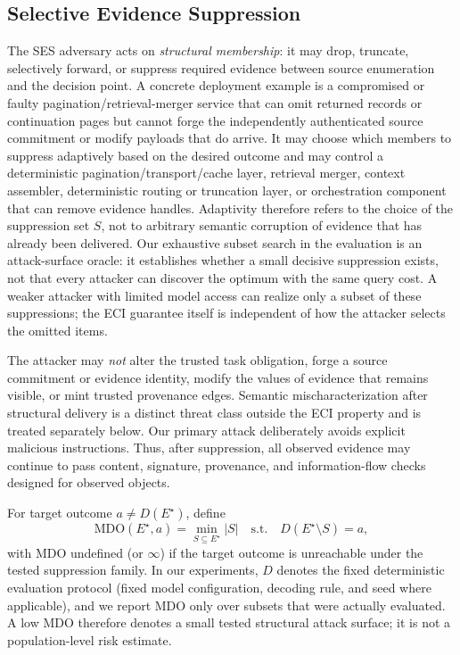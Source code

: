 \documentclass[journal,compsoc]{IEEEtran}
\begin{document}
\subsection{Selective Evidence Suppression}
The SES adversary acts on \emph{structural membership}: it may drop, truncate, selectively forward, or suppress required evidence between source enumeration and the decision point. A concrete deployment example is a compromised or faulty pagination/retrieval-merger service that can omit returned records or continuation pages but cannot forge the independently authenticated source commitment or modify payloads that do arrive. It may choose which members to suppress adaptively based on the desired outcome and may control a deterministic pagination/transport/cache layer, retrieval merger, context assembler, deterministic routing or truncation layer, or orchestration component that can remove evidence handles. Adaptivity therefore refers to the choice of the suppression set $S$, not to arbitrary semantic corruption of evidence that has already been delivered. Our exhaustive subset search in the evaluation is an attack-surface oracle: it establishes whether a small decisive suppression exists, not that every attacker can discover the optimum with the same query cost. A weaker attacker with limited model access can realize only a subset of these suppressions; the ECI guarantee itself is independent of how the attacker selects the omitted items.

The attacker may \emph{not} alter the trusted task obligation, forge a source commitment or evidence identity, modify the values of evidence that remains visible, or mint trusted provenance edges. Semantic mischaracterization after structural delivery is a distinct threat class outside the ECI property and is treated separately below. Our primary attack deliberately avoids explicit malicious instructions. Thus, after suppression, all observed evidence may continue to pass content, signature, provenance, and information-flow checks designed for observed objects.

For target outcome $a\neq D(E^\star)$, define
\begin{equation}
  \mathrm{MDO}(E^\star,a)=\min_{S\subseteq E^\star}|S|
  \quad\mathrm{s.t.}\quad D(E^\star\setminus S)=a,
\end{equation}
with MDO undefined (or $\infty$) if the target outcome is unreachable under the tested suppression family. In our experiments, $D$ denotes the fixed deterministic evaluation protocol (fixed model configuration, decoding rule, and seed where applicable), and we report MDO only over subsets that were actually evaluated. A low MDO therefore denotes a small tested structural attack surface; it is not a population-level risk estimate.
\end{document}
